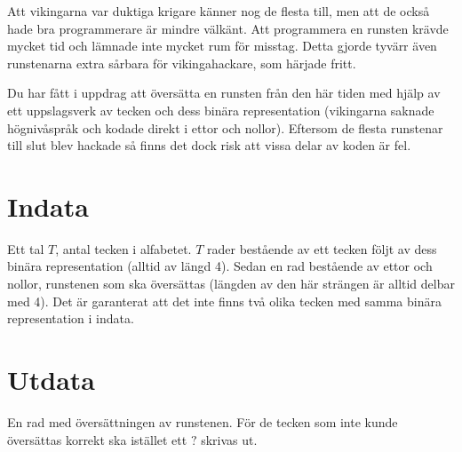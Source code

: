Att vikingarna var duktiga krigare känner nog de flesta till, men att de också hade bra programmerare är mindre välkänt. Att programmera en runsten krävde mycket tid och lämnade inte mycket rum för misstag. Detta gjorde tyvärr även runstenarna extra sårbara för vikingahackare, som härjade fritt.

Du har fått i uppdrag att översätta en runsten från den här tiden med hjälp av ett uppslagsverk av tecken och dess binära representation (vikingarna saknade högnivåspråk och kodade direkt i ettor och nollor). Eftersom de flesta runstenar till slut blev hackade så finns det dock risk att vissa delar av koden är fel.

\section*{Indata}
Ett tal $T$, antal tecken i alfabetet. $T$ rader bestående av ett tecken följt av dess binära representation (alltid av längd 4). Sedan en rad bestående av ettor och nollor, runstenen som ska översättas (längden av den här strängen är alltid delbar med 4). Det är garanterat att det inte finns två olika tecken med samma binära representation i indata.

\section*{Utdata}
En rad med översättningen av runstenen. För de tecken som inte kunde översättas korrekt ska istället ett $?$ skrivas ut.
